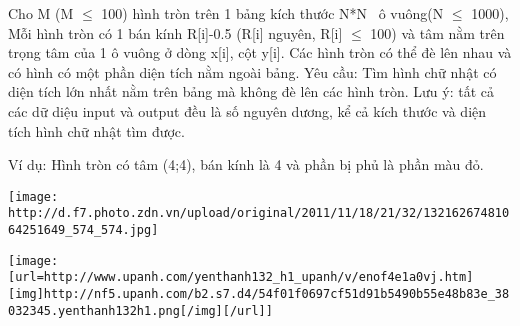 Cho M (M $\le$  100) hình tròn trên 1 bảng kích thước N*N  ô vuông(N  $\le$  1000), Mỗi hình tròn có 1 bán kính R[i]-0.5 (R[i] nguyên, R[i]  $\le$  100) và tâm nằm trên  trọng tâm của 1 ô vuông ở dòng x[i], cột y[i]. Các hình tròn có thể đè lên nhau và có hình có một phần diện tích nằm ngoài bảng. Yêu cầu: Tìm hình chữ nhật có diện tích lớn nhất nằm trên bảng mà không đè lên các hình tròn. Lưu ý: tất cả các dữ diệu input và output đều là số nguyên dương, kể cả kích thước và diện tích hình chữ nhật tìm được.  

   Ví dụ: Hình tròn có tâm (4;4), bán kính là 4 và phần bị phủ là phần màu đỏ.  


\texttt{[image: http://d.f7.photo.zdn.vn/upload/original/2011/11/18/21/32/13216267481064251649\_574\_574.jpg]}


\texttt{[image: [url=http://www.upanh.com/yenthanh132\_h1\_upanh/v/enof4e1a0vj.htm][img]http://nf5.upanh.com/b2.s7.d4/54f01f0697cf51d91b5490b55e48b83e\_38032345.yenthanh132h1.png[/img][/url]]}